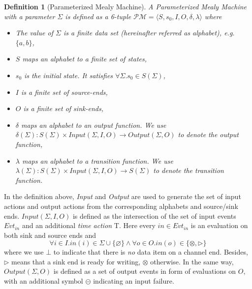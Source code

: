 \documentclass[conference, a4paper]{IEEEtran}
\newtheorem{definition}{Definition}
\newcommand{\rblock}[0]{\circleddash}
\newcommand{\rread}[0]{\rhd}
\newcommand{\rnoread}[0]{\otimes}
\newcommand{\rempty}[0]{\varnothing}
\begin{document}
\begin{definition}[Parameterized Mealy Machine]
  A \emph{Parameterized Mealy Machine} with a parameter $\Sigma$ is defined as a 6-tuple
  $\mathcal{PM}=\langle S, s_0, I, O, \delta, \lambda\rangle$ where 
  \begin{itemize}
    \item[-] The value of $\Sigma$ is a \emph{finite} data set (hereinafter referred as
      alphabet), e.g.  $\{a,b\}$,
    \item[-] $S$ maps an alphabet to a \emph{finite} set of states,
    \item[-] $s_0$ is the initial state. It satisfies $\forall \Sigma.s_0\in S(\Sigma)$,
    \item[-] $I$ is a finite set of source-ends,
    \item[-] $O$ is a finite set of sink-ends,
    \item[-] $\delta$ maps an alphabet to an \emph{output function}. We use
      $\delta(\Sigma):S(\Sigma)\times Input(\Sigma,I,O)\rightarrow Output(\Sigma,O)$ to denote the
      output function,
    \item[-] $\lambda$ maps an alphabet to a \emph{transition function}. We use
      $\lambda(\Sigma):S(\Sigma)\times Input(\Sigma,I,O)\rightarrow S(\Sigma)$ to denote the
      transition function.
  \end{itemize}
\end{definition}

In the definition above, \emph{Input} and \emph{Output} are used to generate the set of input actions
and output actions from the corresponding alphabets and source/sink ends. $Input(\Sigma,I,O)$ is
defined as the intersection of the set of input events $Evt_{in}$ and an additional \emph{time
action} T. Here every $in\in Evt_{in}$ is an evaluation on both sink and source ends and
\[
\forall i\in I.in(i)\in\Sigma\cup\{\rempty\}\land \forall o\in O.in(o)\in\{\rnoread, \rread\}
\]
where we use $\bot$ to indicate that there is \emph{no} data item on a channel end. 
Besides, $\rread$ means that a sink end is ready for writing, $\rnoread$ otherwise. 
In the same way,
$Output(\Sigma,O)$ is defined as a set of output events in form of evaluations on $O$, with an
additional symbol $\rblock$ indicating an input failure.

\end{document}
